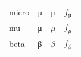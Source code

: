 \documentclass{unittest}
\begin{document}
\begin{tabular}{llll}\toprule
micro & µ & $µ$ & $f_µ$    \\
mu    & μ & $μ$ & $f_μ$    \\
beta  & β & $β$ & $f_β$    \\
\end{tabular}
\end{document}
